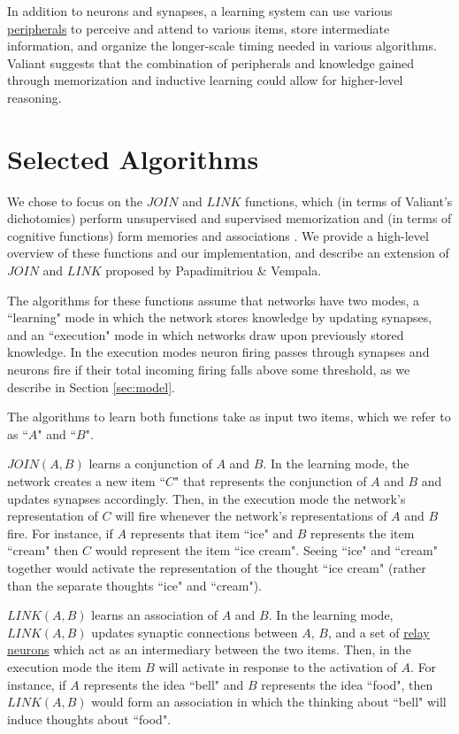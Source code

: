 \documentclass[letterpaper, 12pt]{article}
\begin{document}
In addition to neurons and synapses, a learning system can use various \underline{peripherals} to perceive and attend to various items, store intermediate information, and organize the longer-scale timing needed in various algorithms. Valiant suggests that the combination of peripherals and knowledge gained through memorization and inductive learning could allow for higher-level reasoning.

\section{Selected Algorithms}\label{sec:selected_algorithms}
We chose to focus on the $JOIN$ and $LINK$ functions, which (in terms of Valiant's dichotomies) perform unsupervised and supervised memorization  and (in terms of cognitive functions) form memories and associations \cite{valiant_circuits_1994, papadimitriou_cortical_2015}. We provide a high-level overview of these functions and our implementation, and describe an extension of $JOIN$ and $LINK$ proposed by Papadimitriou \& Vempala.

The algorithms for these functions assume that networks have two modes, a ``learning" mode in which the network stores knowledge by updating synapses, and an ``execution" mode in which networks draw upon previously stored knowledge. In the execution modes neuron firing passes through synapses and neurons fire if their total incoming firing falls above some threshold, as we describe in Section \ref{sec:model}.

The algorithms to learn both functions take as input two items, which we refer to as ``$A$" and ``$B$".

$JOIN(A,B)$ learns a conjunction of $A$ and $B$. In the learning mode, the network creates a new item ``$C$" that represents the conjunction of $A$ and $B$ and updates synapses accordingly. Then, in the execution mode the network's representation of $C$ will fire whenever the network's representations of $A$ and $B$ fire. For instance, if $A$ represents that item ``ice" and $B$ represents the item ``cream" then $C$ would represent the item ``ice cream". Seeing ``ice" and ``cream" together would activate the representation of the thought ``ice cream" (rather than the separate thoughts ``ice" and ``cream").

$LINK(A,B)$ learns an association of $A$ and $B$. In the learning mode, $LINK(A,B)$ updates synaptic connections between $A$, $B$, and a set of \underline{relay neurons} which act as an intermediary between the two items. Then, in the execution mode the item $B$ will activate in response to the activation of $A$. For instance, if $A$ represents the idea ``bell" and $B$ represents the idea ``food", then $LINK(A,B)$ would form an association in which the thinking about ``bell" will induce thoughts about ``food".
\end{document}

